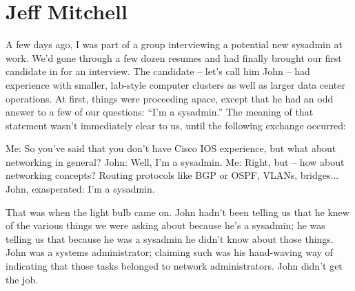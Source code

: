 \chapter{Jeff Mitchell}
A few days ago, I was part of a group interviewing a potential new sysadmin at
work. We’d gone through a few dozen resumes and had finally brought our first
candidate in for an interview. The candidate -- let’s call him John -- had
experience with smaller, lab-style computer clusters as well as larger data
center operations. At first, things were proceeding apace, except that he had an
odd answer to a few of our questions: “I’m a sysadmin.”
The meaning of that statement wasn’t immediately clear to us, until the
following exchange occurred:

Me: So you’ve said that you don’t have Cisco IOS experience, but what about
networking in general?
John: Well, I’m a sysadmin.
Me: Right, but -- how about networking concepts? Routing protocols like BGP or
OSPF, VLANs, bridges...
John, exasperated: I’m a sysadmin.

That was when the light bulb came on. John hadn’t been telling us that he knew
of the various things we were asking about because he’s a sysadmin; he was
telling us that because he was a sysadmin he didn’t know about those things.
John was a systems administrator; claiming such was his hand-waving way of
indicating that those tasks belonged to network administrators.
John didn’t get the job.


